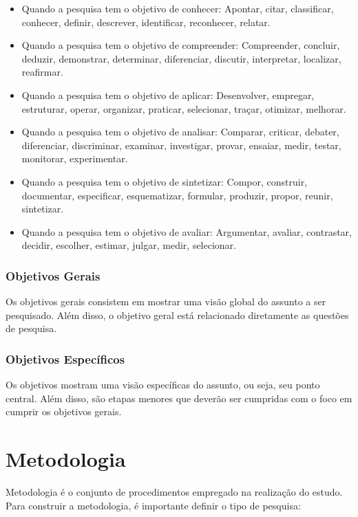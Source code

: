 \begin{itemize}

\item Quando a pesquisa tem o objetivo de conhecer: Apontar, citar, classificar, conhecer, definir, descrever, identificar, reconhecer, relatar.
\item Quando a pesquisa tem o objetivo de compreender: Compreender, concluir, deduzir, demonstrar, determinar, diferenciar, discutir, interpretar, localizar, reafirmar.
\item Quando a pesquisa tem o objetivo de aplicar: Desenvolver, empregar, estruturar, operar, organizar,
praticar, selecionar, traçar, otimizar, melhorar.
\item Quando a pesquisa tem o objetivo de analisar: Comparar, criticar, debater, diferenciar, discriminar, examinar, investigar, provar, ensaiar, medir, testar, monitorar, experimentar.
\item Quando a pesquisa tem o objetivo de sintetizar: Compor, construir, documentar, especificar, esquematizar, formular, produzir, propor, reunir, sintetizar.
\item Quando a pesquisa tem o objetivo de avaliar: Argumentar, avaliar, contrastar, decidir, escolher, estimar, julgar, medir, selecionar.

\end{itemize}


\subsection{Objetivos Gerais}

Os objetivos gerais consistem em mostrar uma visão global do assunto a ser pesquisado. Além disso, o objetivo geral está relacionado diretamente as questões de pesquisa.
    
\subsection{Objetivos Específicos}

Os objetivos mostram uma visão específicas do assunto, ou seja, seu ponto central. Além disso, são etapas menores que deverão ser cumpridas com o foco em cumprir os objetivos gerais.
    

\chapter{Metodologia}

Metodologia é o conjunto de procedimentos empregado na realização do estudo. Para construir a metodologia, é importante definir o tipo de pesquisa:

